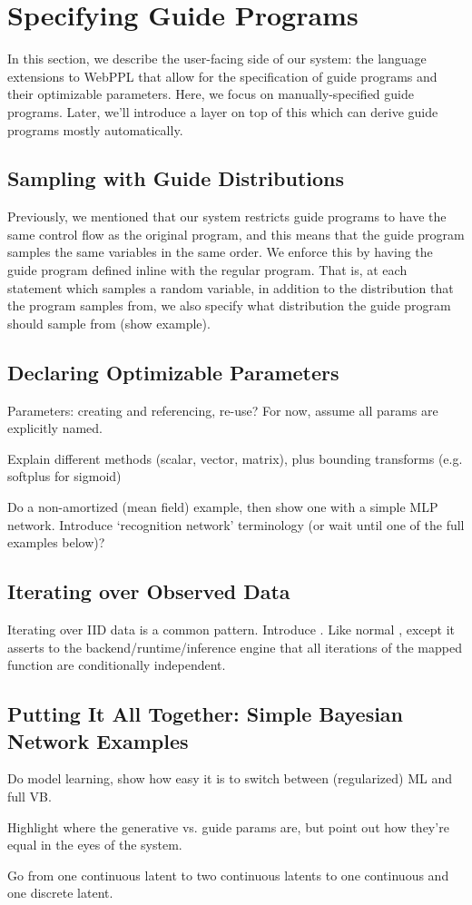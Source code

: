 \section{Specifying Guide Programs}
\label{sec:guideSpec}

In this section, we describe the user-facing side of our system: the language extensions to WebPPL that allow for the specification of guide programs and their optimizable parameters.
Here, we focus on manually-specified guide programs. Later, we'll introduce a layer on top of this which can derive guide programs mostly automatically.

\subsection{Sampling with Guide Distributions}

Previously, we mentioned that our system restricts guide programs to have the same control flow as the original program, and this means that the guide program samples the same variables in the same order.
We enforce this by having the guide program defined inline with the regular program.
That is, at each  statement which samples a random variable, in addition to the distribution that the program samples from, we also specify what distribution the guide program should sample from (show example).

\subsection{Declaring Optimizable Parameters}

Parameters: creating and referencing, re-use? For now, assume all params are explicitly named.

Explain different methods (scalar, vector, matrix), plus bounding transforms (e.g. softplus for sigmoid)

Do a non-amortized (mean field) example, then show one with a simple MLP network. Introduce `recognition network' terminology (or wait until one of the full examples below)?

\subsection{Iterating over Observed Data}

Iterating over IID data is a common pattern.
Introduce .
Like normal , except it asserts to the backend/runtime/inference engine that all iterations of the mapped function are conditionally independent.


\subsection{Putting It All Together: Simple Bayesian Network Examples}

Do model learning, show how easy it is to switch between (regularized) ML and full VB.

Highlight where the generative vs. guide params are, but point out how they're equal in the eyes of the system.

Go from one continuous latent to two continuous latents to one continuous and one discrete latent.

